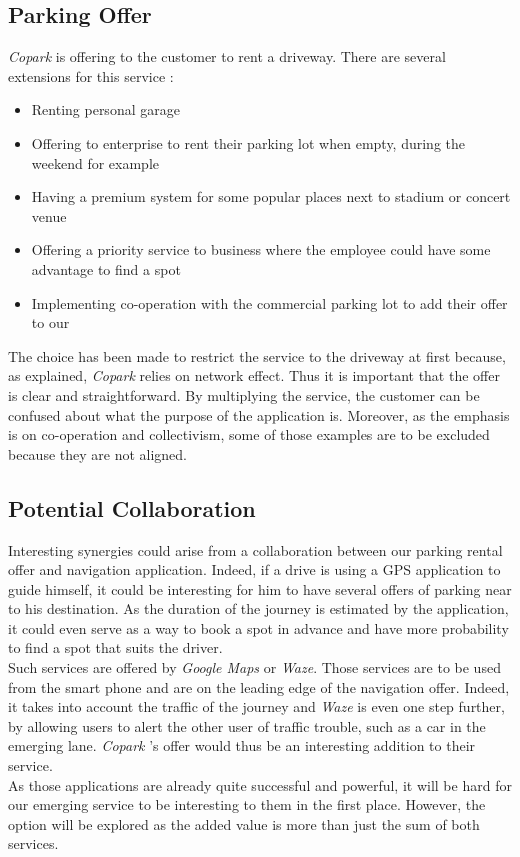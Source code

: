 \documentclass[12pt,a4paper,oneside]{book}
\newcommand{\bp}{\textit{Copark }}
\begin{document}
\subsection{Parking Offer}
\bp is offering to the customer to rent a driveway. There are several extensions for this service :
\begin{itemize}
\item Renting personal garage
\item Offering to enterprise to rent their parking lot when empty, during the weekend for example
\item Having a premium system for some popular places next to stadium or concert venue
\item Offering a priority service to business where the employee could have some advantage to find a spot
\item Implementing co-operation with the commercial parking lot to add their offer to our
\end{itemize} 
The choice has been made to restrict the service to the driveway at first because, as explained, \bp relies on network effect. Thus it is important that the offer is clear and straightforward. By multiplying the service, the customer can be confused about what the purpose of the application is. Moreover, as the emphasis is on co-operation and collectivism, some of those examples are to be excluded because they are not aligned.

\subsection{Potential Collaboration}
Interesting synergies could arise from a collaboration between our parking rental offer and navigation application. Indeed, if a drive is using a GPS application to guide himself, it could be interesting for him to have several offers of parking near to his destination. As the duration of the journey is estimated by the application, it could even serve as a way to book a spot in advance and have more probability to find a spot that suits the driver.\\
Such services are offered by \textit{Google Maps} or \textit{Waze}. Those services are to be used from the smart phone and are on the leading edge of the navigation offer. Indeed, it takes into account the traffic of the journey and \textit{Waze} is even one step further, by allowing users to alert the other user of traffic trouble, such as a car in the emerging lane. \bp's offer would thus be an interesting addition to their service.\\
As those applications are already quite successful and powerful, it will be hard for our emerging service to be interesting to them in the first place. However, the option will be explored as the added value is more than just the sum of both services.\\
\end{document}
